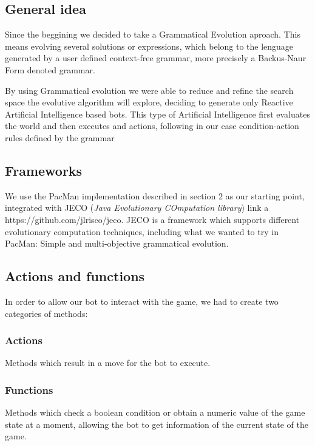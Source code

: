 \documentclass{llncs}
\begin{document}
\subsection{General idea}
Since the beggining we decided to take a Grammatical Evolution aproach. This means evolving several solutions or expressions, which belong to the lenguage generated by a user defined context-free grammar, more precisely a Backus-Naur Form denoted grammar. 

By using Grammatical evolution we were able to reduce and refine the search space the evolutive algorithm will explore, deciding to generate only Reactive Artificial Intelligence based bots. This type of Artificial Intelligence first evaluates the world and then executes and actions, following in our case condition-action rules defined by the grammar

\subsection{Frameworks}
We use the PacMan implementation described in section 2 as our starting point, integrated with JECO (\textit{Java Evolutionary COmputation library}) {\color{red} link a https://github.com/jlrisco/jeco}. JECO is a framework which supports different evolutionary computation techniques, including what we wanted to try in PacMan: Simple and multi-objective grammatical evolution.


\subsection{Actions and functions}
In order to allow our bot to interact with the game, we had to create two categories of methods:

\subsubsection{Actions}
Methods which result in a move for the bot to execute.
\subsubsection{Functions}
Methods which check a boolean condition or obtain a numeric value of the game state at a moment, allowing the bot to get information of the current state of the game.
\end{document}
